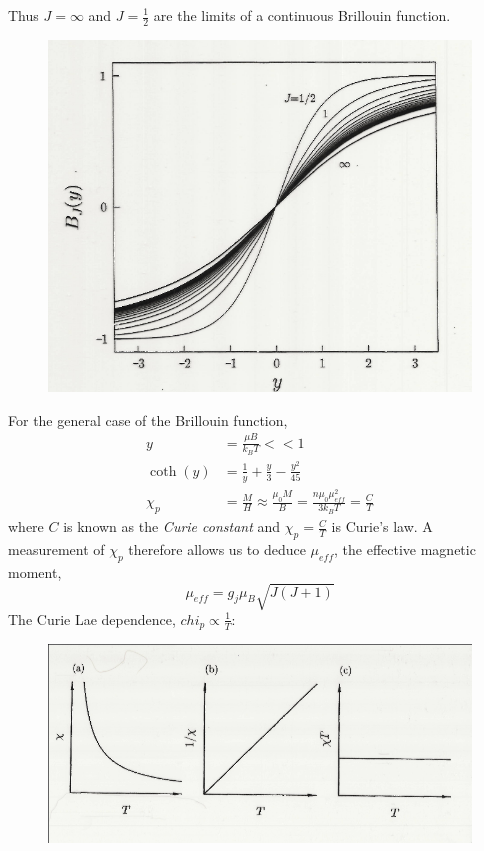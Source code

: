 \documentclass[a4paper, 11pt, normalem]{report}
\begin{document}
Thus $J=\infty$ and $J=\frac12$ are the limits of a continuous Brillouin function.
\begin{figure}[H]
    \centering
    \includegraphics[scale=0.5]{lims.png}
\end{figure}
For the general case of the Brillouin function,
\begin{align}
    y &= \frac{\mu B}{k_BT} << 1 \\
    \coth(y) &= \frac{1}{y} + \frac{y}{3} - \frac{y^2}{45} \\
    \chi_p &= \frac{M}{H} \approx \frac{\mu_0M}{B} = \frac{n\mu_0\mu_{eff}^2}{3k_BT} = \frac{C}{T}
\end{align}
where $C$ is known as the \emph{Curie constant} and $\chi_p = \frac{C}{T}$ is Curie's law. 
A measurement of $\chi_p$ therefore allows us to deduce $\mu_{eff}$, the effective magnetic moment, 
\begin{equation}
    \mu_{eff} = g_j\mu_B\sqrt{J(J+1)}
\end{equation}
The Curie Lae dependence, $chi_p \propto \frac{1}{T}$:
\begin{figure}[H]
    \centering
    \includegraphics[scale=0.5]{curie.png}
\end{figure}
\end{document}
